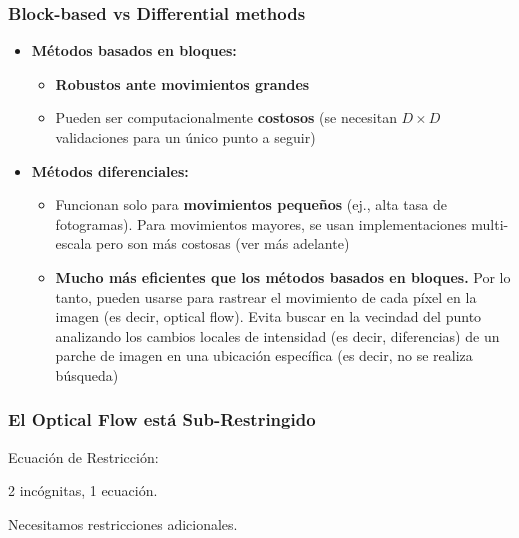 \begin{frame}
    \frametitle{Block-based vs Differential methods}
    
    \begin{itemize}
        \item \textbf{Métodos basados en bloques:}
        \begin{itemize}
            \item \textbf{Robustos ante movimientos grandes}
            \item Pueden ser computacionalmente \textbf{costosos} (se necesitan $D \times D$ validaciones para un único punto a seguir)
        \end{itemize}
    \end{itemize}

    \vspace{0.5em} %

    \begin{itemize}
        \item \textbf{Métodos diferenciales:}
        \begin{itemize}
            \item Funcionan solo para \textbf{movimientos pequeños} (ej., alta tasa de fotogramas). Para movimientos mayores, se usan implementaciones multi-escala pero son más costosas (ver más adelante)
            \item \textbf{Mucho más eficientes que los métodos basados en bloques.} Por lo tanto, pueden usarse para rastrear el movimiento de cada píxel en la imagen (es decir, optical flow). Evita buscar en la vecindad del punto analizando los cambios locales de intensidad (es decir, diferencias) de un parche de imagen en una ubicación específica (es decir, no se realiza búsqueda)
        \end{itemize}
    \end{itemize}

\end{frame}

\begin{frame}
  \frametitle{El Optical Flow está Sub-Restringido}

  Ecuación de Restricción: \quad {}

  \vspace{0.5cm}
  2 incógnitas, 1 ecuación.

  \vspace{1cm}
  Necesitamos restricciones adicionales.

\end{frame}


